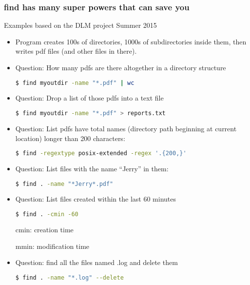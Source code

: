 \documentclass[English]{beamer}
\begin{document}
\begin{frame}
  \frametitle{ find has many super powers that can save you}

Examples based on the DLM project Summer 2015
\begin{itemize}

    \item  Program creates 100s of directories, 1000s of
      subdirectories inside them, then writes pdf files (and other
      files in there). 
    \item Question: How many pdfs are there altogether in a directory
      structure

\begin{lstlisting}[breaklines=true,language=bash]
$ find myoutdir -name "*.pdf" | wc  
\end{lstlisting}
   \item Question: Drop a list of those pdfs into a text file

\begin{lstlisting}[breaklines=true,language=bash]
$ find myoutdir -name "*.pdf" > reports.txt 
\end{lstlisting}
    \item Question: List pdfs have total names (directory path
      beginning at current location) longer than 200 characters:

\begin{lstlisting}[breaklines=true,language=bash]
$ find -regextype posix-extended -regex '.{200,}'
\end{lstlisting}
   \item Question: List files with the name ``Jerry'' in them:

\begin{lstlisting}[breaklines=true,language=bash]
$ find . -name "*Jerry*.pdf"
\end{lstlisting}


    \item Question: List files created within the last 60 minutes

\begin{lstlisting}[breaklines=true,language=bash]
$ find . -cmin -60
\end{lstlisting}
 
cmin: creation time

mmin: modification time

  \item Question: find all the files named \*.log and delete them

\begin{lstlisting}[breaklines=true,language=bash]
$ find . -name "*.log" --delete
\end{lstlisting}
  \end{itemize}
\end{frame}
\end{document}
